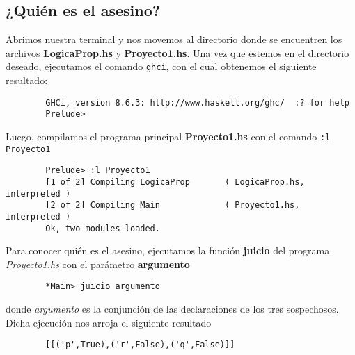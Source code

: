 \documentclass[letterpaper,12pt]{article}
\begin{document}
    \subsection{¿Quién es el asesino?}
    Abrimos nuestra terminal y nos movemos al directorio donde se encuentren 
    los archivos \textbf{LogicaProp.hs} y \textbf{Proyecto1.hs}. Una vez que 
    estemos en el directorio deseado, ejecutamos el comando \texttt{ghci}, 
    con el cual obtenemos el siguiente resultado:
    \begin{lstlisting}
        GHCi, version 8.6.3: http://www.haskell.org/ghc/  :? for help
        Prelude> 
    \end{lstlisting}

    \justify
    Luego, compilamos el programa principal \textbf{Proyecto1.hs} con el 
    comando \texttt{:l Proyecto1}
    \begin{lstlisting}
        Prelude> :l Proyecto1
        [1 of 2] Compiling LogicaProp       ( LogicaProp.hs, interpreted )
        [2 of 2] Compiling Main             ( Proyecto1.hs, interpreted )
        Ok, two modules loaded.
    \end{lstlisting}

    Para conocer quién es el asesino, ejecutamos la función \textbf{juicio} 
    del programa \textit{Proyecto1.hs} con el parámetro \textbf{argumento}
    \begin{lstlisting}
        *Main> juicio argumento
    \end{lstlisting}

    donde \textit{argumento} es la conjunción de las declaraciones de los 
    tres sospechosos. Dicha ejecución nos arroja el siguiente resultado
    \begin{lstlisting}
        [[('p',True),('r',False),('q',False)]]
    \end{lstlisting}
\end{document}
